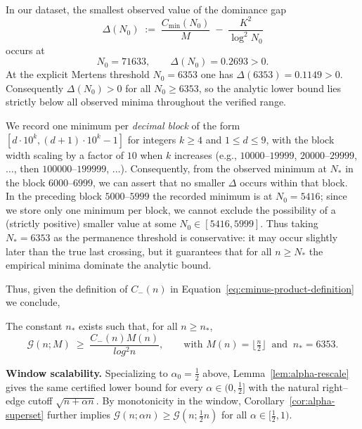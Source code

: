 \documentclass[11pt]{article}
\makeatletter
\theoremstyle{inline}
\theoremstyle{break}
\renewenvironment{proof}[1][\proofname]{%
  \par\pushQED{\qed}%
  \normalfont \topsep6\p@\@plus6\p@\relax
  \trivlist
  \item[\hskip\labelsep
        \itshape
    #1\@addpunct{.}]\mbox{}\\  %
}{%
  \popQED\endtrivlist\@endpefalse
}
\theoremstyle{break}
\theoremstyle{break}
\theoremstyle{break}
\theoremstyle{break}
\theoremstyle{break}
\theoremstyle{break}
\theoremstyle{inline}
\newcommand{\xPreMertens}{5416} %
\newcommand{\xMertens}{6353} %
\newcommand{\xNzeroStat}{71633} %
\newcommand{\xEtaStat}{0.2693} %
\newcommand{\xDeltaMertens}{0.1149}  %
\newcommand{\Cmeas}{C}              %
\newcommand{\CminusProduct}{C_{-}}
\makeatother
\begin{document}
\begin{proof}
In our dataset, the smallest observed value of the dominance gap
\begin{equation}
\Delta(N_0)\;:=\;\frac{\Cmeas_{\min}(N_0)}{M}\;-\;\frac{K^2}{\log^2 N_0}
\end{equation}
occurs at
\begin{equation}
N_0=\xNzeroStat,\qquad \Delta(N_0)=\xEtaStat>0.
\end{equation}
At the explicit Mertens threshold \(N_0=\xMertens\) one has
\(\Delta(\xMertens)=\xDeltaMertens>0\).
Consequently \(\Delta(N_0)>0\) for all \(N_0\ge \xMertens\), so the analytic
lower bound lies strictly below all observed minima throughout the verified range.

We record one minimum per \emph{decimal block} of the form
\([d\cdot 10^{k},(d+1)\cdot 10^{k}-1]\) for integers \(k\ge 4\) and \(1\le d\le 9\),
with the block width scaling by a factor of \(10\) when \(k\) increases (e.g.,
\(10000\text{–}19999\), \(20000\text{–}29999\), \(\dots\), then \(100000\text{–}199999\), \(\dots\)).
Consequently, from the observed minimum at \(N_\ast\) in the block
\(6000\text{–}6999\), we can assert that no smaller \( \Delta \) occurs within that block.
In the preceding block \(5000\text{–}5999\) the recorded minimum is at \(N_0=\xPreMertens\);
since we store only one minimum per block, we cannot exclude the possibility of a
(strictly positive) smaller value at some \(N_0\in[\xPreMertens,5999]\). Thus taking
\(N_\ast=\xMertens\) as the permanence threshold is conservative: it may occur
slightly later than the true last crossing, but it guarantees that for all
\(n\ge N_\ast\) the empirical minima dominate the analytic bound.

\bigskip
\noindent
Thus, given the definition of \( \CminusProduct(n) \) in Equation~\ref{eq:cminus-product-definition} we conclude,

The constant \( n_\ast \) exists such that, for all \(n \ge n_\ast\),
  \begin{equation}
    \mathcal{G}(n;M)\;\ge\;\frac{\CminusProduct(n)M(n)}{log^2 n},
    \qquad
    \text{with } M(n)=\bigl\lfloor \tfrac{n}{2} \bigr\rfloor
    \ \text{ and }\
    n_\ast=\xMertens .
    \label{eq:analytic-lower-bound-global}
  \end{equation}
\end{proof}

\noindent\textbf{Window scalability.}
Specializing to $\alpha_0=\tfrac12$ above, Lemma~\ref{lem:alpha-rescale} gives the same certified lower bound for every $\alpha\in(0,\tfrac12]$ with the natural right–edge cutoff $\sqrt{n+\alpha n}$. 
By monotonicity in the window, Corollary~\ref{cor:alpha-superset} further implies $\mathcal{G}(n;\alpha n)\ge \mathcal{G}(n;\tfrac12 n)$ for all $\alpha\in[\tfrac12,1)$.
\end{document}
